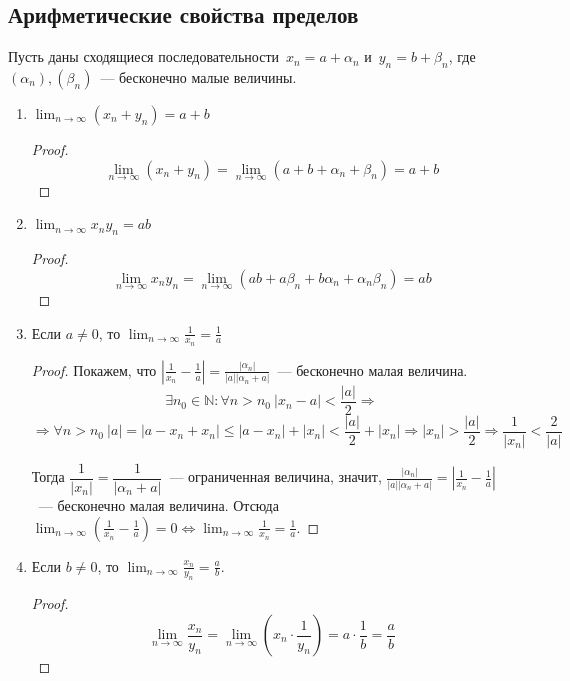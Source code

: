 \subsection{Арифметические свойства пределов}
Пусть даны сходящиеся последовательности~$x_n = a + \alpha_n$ и~$y_n = b + \beta_n$, где $(\alpha_n), (\beta_n)$~--- бесконечно малые величины.
\begin{enumerate}
	\item $\displaystyle \lim_{n \to \infty} (x_n + y_n) = a + b$
	\begin{proof}
	\begin{equation*}
	\lim_{n \to \infty} (x_n + y_n) = \lim_{n \to \infty} (a + b + \alpha_n + \beta_n) = a + b
	\end{equation*}
	\end{proof}
	
	\item $\displaystyle \lim_{n \to \infty} x_n y_n = ab$
	\begin{proof}
	\begin{equation*}
	\lim_{n \to \infty} x_n y_n = \lim_{n \to \infty} (ab + a\beta_n + b\alpha_n + \alpha_n \beta_n) = ab
	\end{equation*}
	\end{proof}
	
	\item Если $a \neq 0$, то $\displaystyle \lim_{n \to \infty} \frac1{x_n} = \frac1a$
	\begin{proof}
	Покажем, что $\displaystyle \left| \frac1{x_n} - \frac1a \right| = \frac{|\alpha_n|}{|a||\alpha_n + a|}$~--- бесконечно малая величина.
	\begin{equation*}
	\exists n_0 \in \mathbb N \colon \forall n > n_0 \ |x_n - a| < \frac{|a|}2 \Rightarrow
	\end{equation*}
	\begin{equation*}
	\Rightarrow \forall n > n_0 \ |a| = |a - x_n + x_n| \leqslant |a - x_n| + |x_n| < \frac{|a|}2 + |x_n| \Rightarrow |x_n| > \frac{|a|}2 \Rightarrow \frac1{|x_n|} < \frac2{|a|}
	\end{equation*}
	
	Тогда $\dfrac1{|x_n|} = \dfrac1{|\alpha_n + a|}$~--- ограниченная величина, значит,
	$\displaystyle \frac{|\alpha_n|}{|a||\alpha_n + a|} = \left| \frac1{x_n} - \frac1a \right|$~--- бесконечно малая величина.
	Отсюда $\displaystyle \lim_{n \to \infty} \left( \frac1{x_n} - \frac1a \right) = 0 \Leftrightarrow \lim_{n \to \infty} \frac1{x_n} = \frac1a$.
	\end{proof}
	
	\item Если $b \neq 0$, то $\displaystyle \lim_{n \to \infty} \frac{x_n}{y_n} = \frac{a}b$.
	\begin{proof}
	\begin{equation*}
	\lim_{n \to \infty} \frac{x_n}{y_n} =
	\lim_{n \to \infty} \left( x_n \cdot \frac1{y_n} \right) =
	a \cdot \frac1b = \frac{a}b
	\end{equation*}
	\end{proof}
\end{enumerate}

